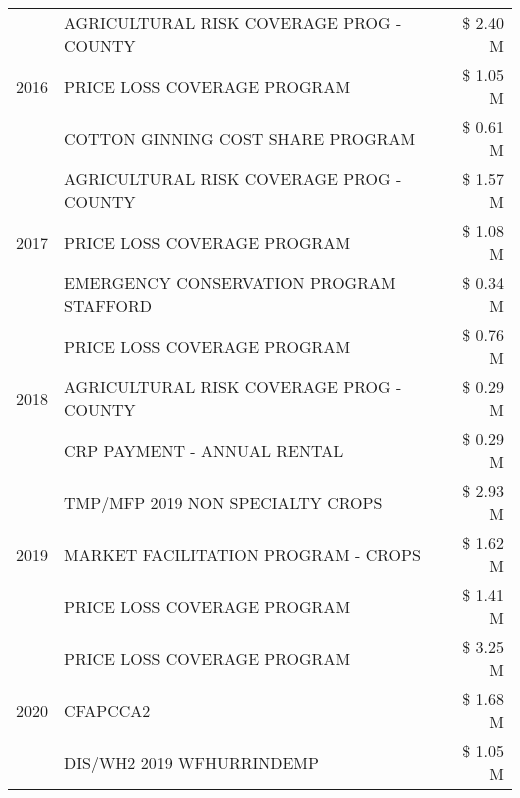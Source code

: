 \begin{tabular}{llr}
\multirow[t]{3}{*}{2016} & AGRICULTURAL RISK COVERAGE PROG - COUNTY & \$ 2.40 M \\
 & PRICE LOSS COVERAGE PROGRAM & \$ 1.05 M \\
 & COTTON GINNING COST SHARE PROGRAM & \$ 0.61 M \\
\cline{1-3}
\multirow[t]{3}{*}{2017} & AGRICULTURAL RISK COVERAGE PROG - COUNTY & \$ 1.57 M \\
 & PRICE LOSS COVERAGE PROGRAM & \$ 1.08 M \\
 & EMERGENCY CONSERVATION PROGRAM STAFFORD & \$ 0.34 M \\
\cline{1-3}
\multirow[t]{3}{*}{2018} & PRICE LOSS COVERAGE PROGRAM & \$ 0.76 M \\
 & AGRICULTURAL RISK COVERAGE PROG - COUNTY & \$ 0.29 M \\
 & CRP PAYMENT - ANNUAL RENTAL & \$ 0.29 M \\
\cline{1-3}
\multirow[t]{3}{*}{2019} & TMP/MFP 2019 NON SPECIALTY CROPS & \$ 2.93 M \\
 & MARKET FACILITATION PROGRAM - CROPS & \$ 1.62 M \\
 & PRICE LOSS COVERAGE PROGRAM & \$ 1.41 M \\
\cline{1-3}
\multirow[t]{3}{*}{2020} & PRICE LOSS COVERAGE PROGRAM & \$ 3.25 M \\
 & CFAPCCA2 & \$ 1.68 M \\
 & DIS/WH2 2019 WFHURRINDEMP & \$ 1.05 M \\
\cline{1-3}
\bottomrule
\end{tabular}
